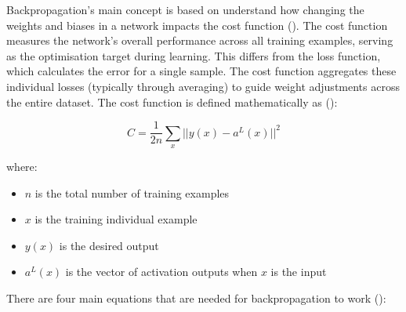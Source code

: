 \parbreak\noindent Backpropagation's main concept is based on understand how changing the weights and biases in a network impacts the cost function (\cite{nielsen2015neural}). The cost function measures the network's overall performance across all training examples, serving as the optimisation target during learning. This differs from the loss function, which calculates the error for a single sample. The cost function aggregates these individual losses (typically through averaging) to guide weight adjustments across the entire dataset. The cost function is defined mathematically as (\cite{nielsen2015neural}):
\begin{ceqn}
    \begin{equation}\label{alg:cost_function}
        C = \frac{1}{2n}\sum_{x} ||y(x)-a^L(x)||^2
    \end{equation}
\end{ceqn}

\noindent where:
\begin{itemize}
    \item $n$ is the total number of training examples
    \item $x$ is the training individual example
    \item $y(x)$ is the desired output
    \item $a^L(x)$ is the vector of activation outputs when $x$ is the input
\end{itemize}

\parbreak\noindent There are four main equations that are needed for backpropagation to work (\cite{nielsen2015neural}):

